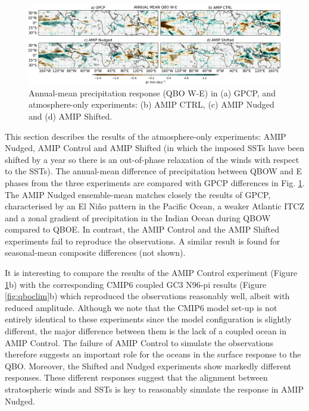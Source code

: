 \begin{figure}[t!]
\centering
 \includegraphics[width=\linewidth]{figures/pr_amip_climqbowqboe.png}
\caption[Annual mean precipitation response in atmosphere-only experiments]{Annual-mean precipitation response (QBO W-E) in (a) GPCP, and atmosphere-only experiments: (b) AMIP CTRL, (c) AMIP Nudged and (d) AMIP Shifted.  }
\label{fig:amip_clim}
\end{figure}

This section describes the results of the atmosphere-only experiments: AMIP Nudged, 
AMIP Control and AMIP Shifted (in which the imposed SSTs have been shifted by a year so there is an out-of-phase relaxation of the winds with respect to the SSTs). The annual-mean difference of precipitation between QBOW and E phases from the three experiments are compared with GPCP differences in Fig. \ref{fig:amip_clim}. The AMIP Nudged ensemble-mean matches closely the results of GPCP, characterised by an El Niño pattern in the Pacific Ocean, a weaker Atlantic ITCZ and a zonal gradient of precipitation in the Indian Ocean during QBOW compared to QBOE. In contrast, the AMIP Control and the AMIP Shifted experiments fail to reproduce the observations. A similar result is found for seasonal-mean composite differences (not shown). 

It is interesting to compare the results of the AMIP Control experiment (Figure \ref{fig:amip_clim}b) with the corresponding CMIP6 coupled GC3 N96-pi results (Figure \ref{fig:qboclim}b) which reproduced the observations reasonably well, albeit with reduced amplitude. Although we note that the CMIP6 model set-up is not entirely identical to these experiments since the model configuration is slightly different, the major difference between them is the lack of a coupled ocean in AMIP Control. The failure of AMIP Control to simulate the observations therefore suggests an important role for the oceans in the surface response to the QBO. 
Moreover, the Shifted and Nudged experiments show markedly different responses. These different responses suggest that the alignment between stratospheric winds and SSTs is key to reasonably simulate the response in AMIP Nudged. 

